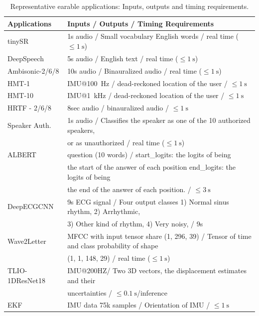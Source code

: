 \begin{table}[]
\label{tab:earbench}
\caption{Representative earable applications: Inputs, outputs and timing requirements.}
\tiny
\begin{tabular}{ll}
\toprule
Applications    & Inputs / Outputs / Timing Requirements  \\ \midrule
tinySR          & 1s audio /
Small vocabulary English words
/ real time ($\leq \SI{1}{\second}$)   \\
DeepSpeech      & 5s audio /
English text
/ real time ($\leq \SI{1}{\second}$)   \\
Ambisonic-2/6/8     & 10s audio /
Binauralized audio
/ real time ($\leq \SI{1}{\second}$)   \\
HMT-1           & IMU@\SI{100}{\hertz} /
dead-reckoned location of the user
/  $\leq \SI{1}{\second}$             \\
HMT-10          & IMU@\SI{1}{\kilo\hertz} /
dead-reckoned location of the user
/ $\leq \SI{1}{\second}$               \\
HRTF - 2/6/8    &  8sec audio / binauralized audio /   $\leq \SI{1}{\second}$ \\
Speaker Auth.   & 1s audio /
Classifies the speaker as one of the 10 authorized speakers,\\
& or as unauthorized
/ real time ($\leq \SI{1}{\second}$)    \\
ALBERT          & question (10 words) /
start\_logits: the logits of being \\
& the start of the answer of each position
end\_logits: the logits of being \\
& the end of the answer of each position.
/  $\leq \SI{3}{\second}$\\
DeepECGCNN      & 9s ECG signal  /
Four output classes 1) Normal sinus rhythm, 2) Arrhythmic, \\
& 3) Other kind
of rhythm,
4) Very noisy,
/ 9s                    \\
Wave2Letter     &  MFCC with input tensor share (1, 296, 39)
/ Tensor of time and class probability of shape \\
& (1, 1, 148, 29)
/ real time ($\leq \SI{1}{\second}$)  \\
TLIO-1DResNet18 & IMU@200HZ/
Two 3D vectors, the displacement estimates and their \\
& uncertainties
/ $\leq \SI{0.1}{\second}$/inference \\
EKF & IMU data 75k samples / Orientation of IMU /  $\leq \SI{1}{\second}$\\
\bottomrule
\end{tabular}
\label{tab:requirements}
\end{table}

